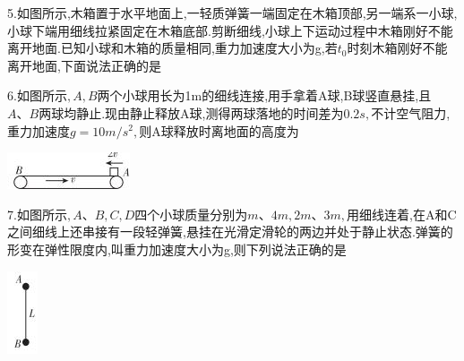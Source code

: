 \begin{solution}{4cm}

\end{solution}



\question[6]5.如图所示,木箱置于水平地面上,一轻质弹簧一端固定在木箱顶部,另一端系一小球,小球下端用细线拉紧固定在木箱底部.剪断细线,小球上下运动过程中木箱刚好不能离开地面.已知小球和木箱的质量相同,重力加速度大小为g,若$t_0$时刻木箱刚好不能离开地面,下面说法正确的是
\begin{solution}{4cm}

\end{solution}



\question[6]6.如图所示$,A,B$两个小球用长为1m的细线连接,用手拿着A球,B球竖直悬挂,且$A、B$两球均静止.现由静止释放A球,测得两球落地的时间差为$0.2s,$不计空气阻力,重力加速度$g=10m/s^2,$则A球释放时离地面的高度为
\begin{center}
\includegraphics[]{img/image6.jpeg}
\end{center}

\begin{solution}{4cm}

\end{solution}



\question[6]7.如图所示$,A、B,C,D$四个小球质量分别为$m、4m,2m、3m,$用细线连着,在A和C之间细线上还串接有一段轻弹簧,悬挂在光滑定滑轮的两边并处于静止状态.弹簧的形变在弹性限度内,叫重力加速度大小为g,则下列说法正确的是
\begin{center}
\includegraphics[]{img/image7.jpeg}
\end{center}

\begin{solution}{4cm}

\end{solution}



